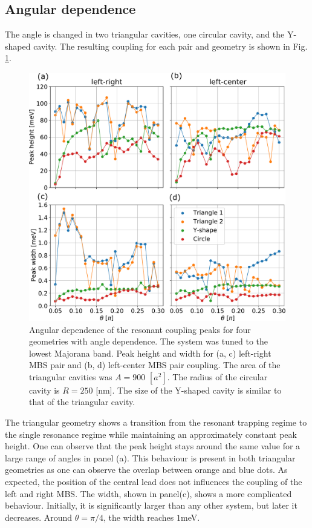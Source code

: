 \subsection{Angular dependence}

The angle is changed in two triangular cavities, one circular cavity, and the Y-shaped cavity.
The resulting coupling for each pair and geometry is shown in Fig. \ref{fig:angles_couplings}.

\begin{figure}
\centering
  \includegraphics[width=0.78\linewidth]{figures/angles_height_width.pdf}
  \caption{Angular dependence of the resonant coupling peaks for four geometries with angle dependence. The system was tuned to the lowest Majorana band. Peak height and width for (a, c) left-right MBS pair and (b, d) left-center MBS pair coupling. The area of the triangular cavities was $A=900$ $[a^2]$. The radius of the circular cavity is $R=250$ [nm]. The size of the Y-shaped cavity is similar to that of the triangular cavity.}
  \label{fig:angles_couplings}
\end{figure}

The triangular geometry shows a transition from the resonant trapping regime to the single resonance regime while maintaining an approximately constant peak height.
One can observe that the peak height stays around the same value for a large range of angles in panel (a).
This behaviour is present in both triangular geometries as one can observe the overlap between orange and blue dots.
As expected, the position of the central lead does not influences the coupling of the left and right MBS.
The width, shown in panel(c), shows a more complicated behaviour.
Initially, it is significantly larger than any other system, but later it decreases.
Around $\theta=\pi/4$, the width reaches $1$meV.

